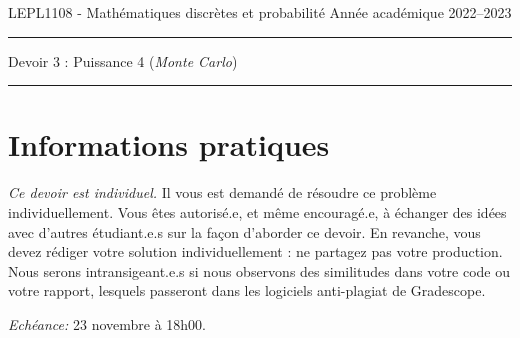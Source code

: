 \documentclass[11pt,answers]{exam}
\begin{document}
\noindent
LEPL1108 - Mathématiques discrètes et probabilité \hfill Année académique 2022--2023\\[-2mm]
\rule{\linewidth}{0.5pt}

\begin{center}

{\large Devoir 3 : Puissance 4 (\textit{Monte Carlo})}
\bigskip

\end{center}
\hrule
\bigskip

\section*{Informations pratiques}
\noindent

\noindent
\emph{Ce devoir est individuel.}
Il vous est demandé de résoudre ce problème individuellement. Vous êtes autorisé.e, et même encouragé.e, à échanger des idées avec d'autres étudiant.e.s sur la façon d'aborder ce devoir. En revanche, vous devez rédiger votre solution individuellement : ne partagez pas votre production. Nous serons intransigeant.e.s si nous observons des similitudes dans votre code ou votre rapport, lesquels passeront dans les logiciels anti-plagiat de Gradescope.  

\bigskip \noindent
\emph{Echéance:} 23 novembre à 18h00.

\bigskip


\noindent
\end{document}
